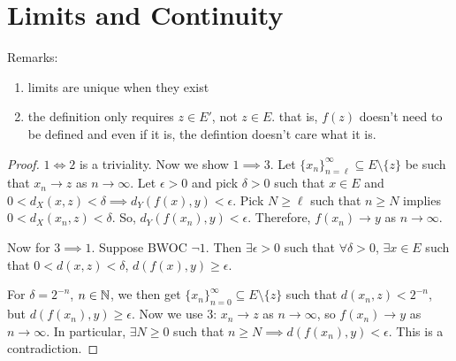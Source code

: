 \documentclass{report}
\begin{document}
\section{Limits and Continuity}
\noindent Remarks:
\begin{enumerate}
    \item limits are unique when they exist
    \item the definition only requires $z \in E'$, not $z \in E$. that is, $f(z)$ doesn't need to be defined and even if it is, the defintion doesn't care what it is. 
\end{enumerate}
\newpage
{}
\begin{proof}
    $1 \iff 2$ is a triviality. Now we show $1 \implies 3$. Let $\{x_n\}_{n = \ell}^\infty \subseteq E \setminus \{z\}$ be such that $x_n \to z$ as $n \to \infty$. Let $\epsilon > 0$ and pick $\delta > 0$ such that $x \in E$ and $0 < d_X(x, z) < \delta \implies d_Y(f(x), y) < \epsilon$. Pick $N \geq \ell$ such that $n \geq N$ implies $0 < d_X(x_n, z) < \delta$. So, $d_Y(f(x_n), y) < \epsilon$. Therefore, $f(x_n) \to y$ as $n \to \infty$.

    Now for $3 \implies 1$. Suppose BWOC $\neg 1$. Then $\exists \epsilon > 0$ such that $\forall \delta > 0$, $\exists x \in E$ such that $0 < d(x, z) < \delta$, $d(f(x), y) \geq \epsilon$. 

    For $\delta = 2^{-n}$, $n \in \NN$, we then get $\{x_n \}_{n = 0}^\infty \subseteq E \setminus \{z\}$ such that $d(x_n, z) < 2^{-n}$, but $d(f(x_n), y) \geq \epsilon$. Now we use $3$: $x_n \to z$ as $n \to \infty$, so $f(x_n) \to y$ as $n \to \infty$. In particular, $\exists N \geq 0$ such that $n \geq N \implies d(f(x_n), y) < \epsilon$. This is a contradiction. 
\end{proof}
\end{document}
